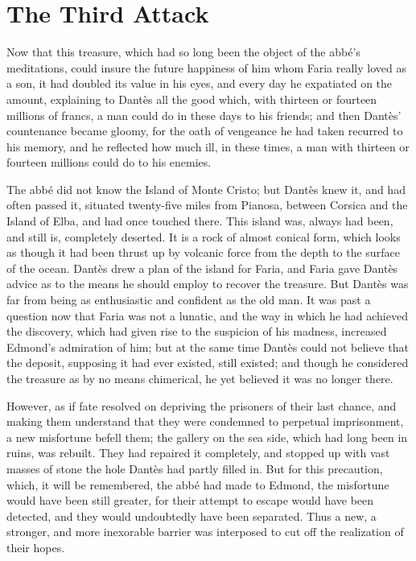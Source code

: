 \chapter{The Third Attack}

Now that this treasure, which had so long been the object of the abbé’s
meditations, could insure the future happiness of him whom Faria really
loved as a son, it had doubled its value in his eyes, and every day he
expatiated on the amount, explaining to Dantès all the good which, with
thirteen or fourteen millions of francs, a man could do in these days
to his friends; and then Dantès’ countenance became gloomy, for the
oath of vengeance he had taken recurred to his memory, and he reflected
how much ill, in these times, a man with thirteen or fourteen millions
could do to his enemies.

The abbé did not know the Island of Monte Cristo; but Dantès knew it,
and had often passed it, situated twenty-five miles from Pianosa,
between Corsica and the Island of Elba, and had once touched there.
This island was, always had been, and still is, completely deserted. It
is a rock of almost conical form, which looks as though it had been
thrust up by volcanic force from the depth to the surface of the ocean.
Dantès drew a plan of the island for Faria, and Faria gave Dantès
advice as to the means he should employ to recover the treasure. But
Dantès was far from being as enthusiastic and confident as the old man.
It was past a question now that Faria was not a lunatic, and the way in
which he had achieved the discovery, which had given rise to the
suspicion of his madness, increased Edmond’s admiration of him; but at
the same time Dantès could not believe that the deposit, supposing it
had ever existed, still existed; and though he considered the treasure
as by no means chimerical, he yet believed it was no longer there.

However, as if fate resolved on depriving the prisoners of their last
chance, and making them understand that they were condemned to
perpetual imprisonment, a new misfortune befell them; the gallery on
the sea side, which had long been in ruins, was rebuilt. They had
repaired it completely, and stopped up with vast masses of stone the
hole Dantès had partly filled in. But for this precaution, which, it
will be remembered, the abbé had made to Edmond, the misfortune would
have been still greater, for their attempt to escape would have been
detected, and they would undoubtedly have been separated. Thus a new, a
stronger, and more inexorable barrier was interposed to cut off the
realization of their hopes.

